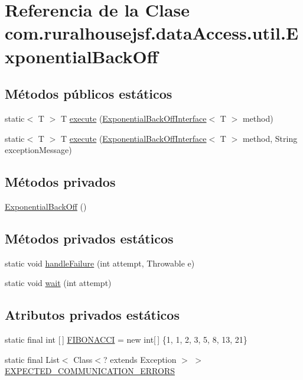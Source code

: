 \hypertarget{a00156}{}\section{Referencia de la Clase com.\+ruralhousejsf.\+data\+Access.\+util.\+Exponential\+Back\+Off}
\label{a00156}
\subsection*{Métodos públicos estáticos}
\begin{DoxyCompactItemize}
\item 
static$<$ T $>$ T \mbox{\hyperlink{a00156_a7c14ce7a46732baa58e3b0bf06455a9b}{execute}} (\mbox{\hyperlink{a00160}{Exponential\+Back\+Off\+Interface}}$<$ T $>$ method)
\item 
static$<$ T $>$ T \mbox{\hyperlink{a00156_a67faf7d5bf9a822979a6531ffc86a60d}{execute}} (\mbox{\hyperlink{a00160}{Exponential\+Back\+Off\+Interface}}$<$ T $>$ method, String exception\+Message)
\end{DoxyCompactItemize}
\subsection*{Métodos privados}
\begin{DoxyCompactItemize}
\item 
\mbox{\hyperlink{a00156_ac6546eba6d6286cb32074d4f3471296d}{Exponential\+Back\+Off}} ()
\end{DoxyCompactItemize}
\subsection*{Métodos privados estáticos}
\begin{DoxyCompactItemize}
\item 
static void \mbox{\hyperlink{a00156_ae0ed24935adcb80c3687465eaf10f3ed}{handle\+Failure}} (int attempt, Throwable e)
\item 
static void \mbox{\hyperlink{a00156_afd1c5c5ac98adfcf35e0542079fb5314}{wait}} (int attempt)
\end{DoxyCompactItemize}
\subsection*{Atributos privados estáticos}
\begin{DoxyCompactItemize}
\item 
static final int \mbox{[}$\,$\mbox{]} \mbox{\hyperlink{a00156_aa65d2215973a1a6aa71bdbfa80b7cef8}{F\+I\+B\+O\+N\+A\+C\+CI}} = new int\mbox{[}$\,$\mbox{]} \{1, 1, 2, 3, 5, 8, 13, 21\}
\item 
static final List$<$ Class$<$? extends Exception $>$ $>$ \mbox{\hyperlink{a00156_a0f2932219cfe361f790b6d456ac68e1e}{E\+X\+P\+E\+C\+T\+E\+D\+\_\+\+C\+O\+M\+M\+U\+N\+I\+C\+A\+T\+I\+O\+N\+\_\+\+E\+R\+R\+O\+RS}}
\end{DoxyCompactItemize}


